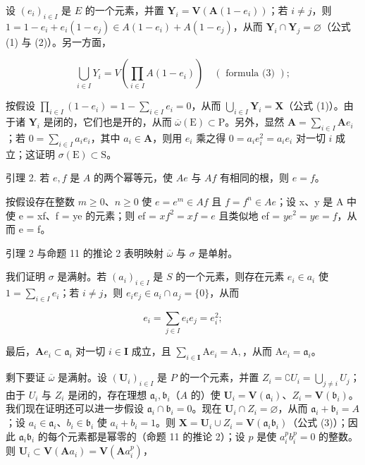 设 \((e_i)_{i\in I}\) 是 \(E\) 的一个元素，并置 \(\mathbf{Y}_i = \mathbf{V}(\mathbf{A}(1 - e_i))\)；若 \(i\neq j\)，则 \(1 = 1 - e_i + e_i(1 - e_j)\in A(1 - e_i) + A(1 - e_j)\)，从而 \(\mathbf{Y}_i\cap \mathbf{Y}_j = \varnothing\)（公式 (1) 与 (2)）。另一方面，

\[
\bigcup_ {i \in I} Y _ {i} = V \left(\prod_ {i \in I} A (1 - e _ {i})\right) \quad (\text { formula   (3) });
\]

按假设 \(\prod_{i\in I}(1 - e_i) = 1 - \sum_{i\in I}e_i = 0\)，从而 \(\bigcup_{i\in I}\mathbf{Y}_i = \mathbf{X}\)（公式 (1)）。由于诸 \(\mathbf{Y}_i\) 是闭的，它们也是开的，从而 \(\overline{\omega} (\mathrm{E})\subset \mathrm{P}\)。另外，显然 \(\mathbf{A} = \sum_{i\in I}\mathbf{A}e_i\)；若 \(0 = \sum_{i\in I}a_{i}e_{i}\)，其中 \(a_{i}\in \mathbf{A}\)，则用 \(e_i\) 乘之得 \(0 = a_i e_i^2 = a_i e_i\) 对一切 \(i\) 成立；这证明 \(\sigma (\mathrm{E})\subset \mathrm{S}\)。

引理 2. 若 \(e, f\) 是 \(A\) 的两个幂等元，使 \(Ae\) 与 \(Af\) 有相同的根，则 \(e = f\)。

按假设存在整数 \(m \geqslant 0\)、\(n \geqslant 0\) 使 \(e = e^{m} \in Af\) 且 \(f = f^{n} \in Ae\)；设 x、y 是 A 中使 e = xf、f = ye 的元素；则 ef = \(xf^{2} = xf = e\) 且类似地 ef = \(ye^{2} = ye = f\)，从而 e = f。

引理 2 与命题 11 的推论 2 表明映射 \(\overline{\omega}\) 与 \(\sigma\) 是单射。

我们证明 \(\sigma\) 是满射。若 \((a_{i})_{i\in I}\) 是 \(S\) 的一个元素，则存在元素 \(e_i\in a_i\) 使 \(1 = \sum_{i\in I}e_i\)；若 \(i\neq j\)，则 \(e_i e_j\in a_i\cap a_j = \{0\}\)，从而

\[
e _ {i} = \sum_ {j \in I} e _ {i} e _ {j} = e _ {i} ^ {2};
\]

最后，\(\mathbf{A}e_{i}\subset \mathfrak{a}_{i}\) 对一切 \(i\in \mathbf{I}\) 成立，且 \(\sum_{i\in \mathbf{I}}\mathrm{A}e_i = \mathrm{A},\)，从而 \(\mathrm{A}e_{i} = \mathfrak{a}_{i}\)。

剩下要证 \(\overline{\omega}\) 是满射。设 \((\mathbf{U}_i)_{i\in I}\) 是 \(P\) 的一个元素，并置 \(Z_{i} = \complement U_{i} = \bigcup_{j\neq i}U_{j}\)；由于 \(U_{i}\) 与 \(Z_{i}\) 是闭的，存在理想 \(\mathfrak{a}_i,\mathfrak{b}_i\)（\(A\) 的）使 \(\mathbf{U}_i = \mathbf{V}(\mathfrak{a}_i)\)、\(Z_{i} = \mathbf{V}(\mathfrak{b}_{i})\)。我们现在证明还可以进一步假设 \(\mathfrak{a}_i\cap \mathfrak{b}_i = 0\)。现在 \(\mathbf{U}_i\cap Z_i = \varnothing\)，从而 \(\mathfrak{a}_i + \mathfrak{b}_i = A\)；设 \(a_i\in \mathfrak{a}_i\)、\(b_{i}\in \mathfrak{b}_{i}\) 使 \(a_{i} + b_{i} = 1\)。则 \(\mathbf{X} = \mathbf{U}_i\cup Z_i = \mathbf{V}(\mathfrak{a}_i\mathfrak{b}_i)\)（公式 (3)）；因此 \(\mathfrak{a}_i\mathfrak{b}_i\) 的每个元素都是幂零的（命题 11 的推论 2）；设 \(p\) 是使 \(a_i^p b_i^p = 0\) 的整数。则 \(\mathbf{U}_i\subset \mathbf{V}(\mathbf{A}a_i) = \mathbf{V}(\mathbf{A}a_i^p)\)，

